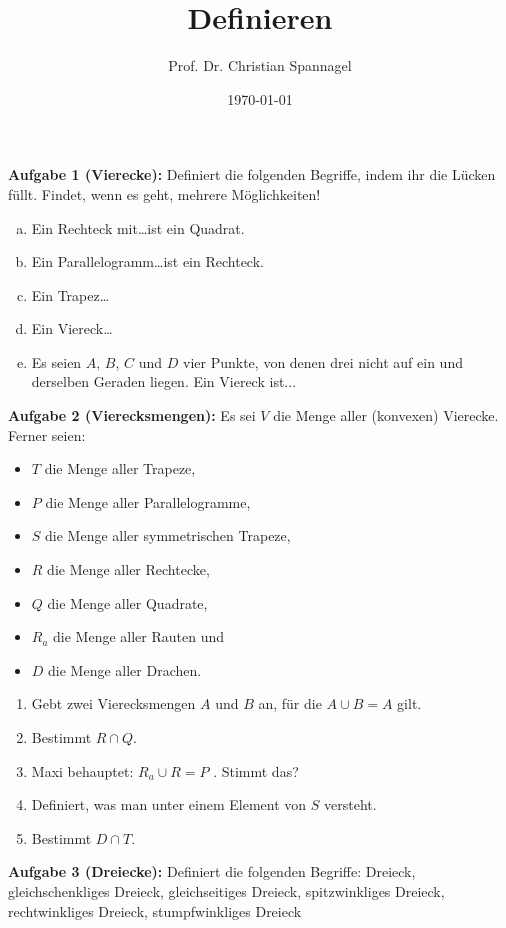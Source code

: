 \documentclass[12pt,a4paper,oneside,ngerman]{article}
\title{Definieren}
\author{Prof. Dr. Christian Spannagel}
\date{\today}
\begin{document}
\pagestyle{fancy}
\begin{center}
\vspace*{5mm}
{\LARGE\textbf{\thetitle}}
\end{center}

\vspace*{10mm}

\vspace*{10mm}

\textbf{Aufgabe 1 (Vierecke):}  Definiert die folgenden Begriffe, indem ihr die Lücken füllt. Findet, wenn es geht, mehrere Möglichkeiten!
\begin{enumerate}[a)]
\item Ein Rechteck mit\ldots ist ein Quadrat.
\item Ein Parallelogramm\ldots ist ein Rechteck.
\item Ein Trapez\ldots
\item Ein Viereck\ldots
\item Es seien $A$, $B$, $C$ und $D$ vier Punkte, von denen drei nicht auf ein und derselben Geraden liegen. Ein Viereck ist...
\end{enumerate}

\textbf{Aufgabe 2 (Vierecksmengen):} Es sei $V$ die Menge aller (konvexen) Vierecke. Ferner seien: 
\begin{itemize}
\item $T$ die Menge aller Trapeze,
\item $P$ die Menge aller Parallelogramme,
\item $S$ die Menge aller symmetrischen Trapeze,
\item $R$ die Menge aller Rechtecke,
\item $Q$ die Menge aller Quadrate,
\item $R_a$ die Menge aller Rauten und
\item $D$ die Menge aller Drachen.
\end{itemize}
\begin{enumerate}
\item Gebt zwei Vierecksmengen $A$ und $B$ an, für die $A\cup B = A$ gilt.
\item Bestimmt $R \cap Q$.
\item Maxi behauptet: $R_a \cup R = P$ . Stimmt das?
\item Definiert, was man unter einem Element von $S$ versteht.
\item Bestimmt $D\cap T$.
\end{enumerate}

\textbf{Aufgabe 3 (Dreiecke):}  Definiert die folgenden Begriffe: Dreieck, gleichschenkliges Dreieck, gleichseitiges Dreieck, spitzwinkliges Dreieck, rechtwinkliges Dreieck, stumpfwinkliges Dreieck
\end{document}
